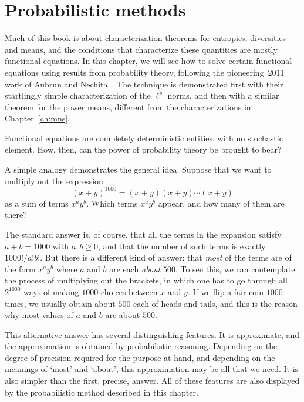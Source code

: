 \chapter{Probabilistic methods}

Much of this book is about characterization theorems for entropies,
diversities and means, and the conditions that characterize these
quantities are mostly functional%
%
% 
equations.  In this chapter, we will see how to solve certain
functional equations using results from probability theory, following the
pioneering~2011 work of Aubrun and Nechita~\cite{AuNe}.  The technique is
demonstrated first with their startlingly simple characterization of the
$\ell^p$ norms, and then with a similar theorem for the power means,
different from the characterizations in Chapter~\ref{ch:mns}.

Functional equations are completely deterministic entities, with no
stochastic element.  How, then, can the power of probability theory be
brought to bear?

A simple analogy demonstrates the general idea.  Suppose that we want to
multiply out the expression
\[
(x + y)^{1000} = (x + y)(x + y) \cdots (x + y)
\]
as a sum of terms $x^a y^b$.  Which terms $x^a y^b$%
%
% 
appear, and how many of them are there?

The standard answer is, of course, that all the terms in the expansion
satisfy $a + b = 1000$ with $a, b \geq 0$, and that the number of such
terms is exactly $1000!/a!b!$.  But there is a different kind of answer:
that \emph{most} of the terms are of the form $x^a y^b$ where $a$ and $b$
are each \emph{about} $500$.  To see this, we can contemplate
the process of multiplying out the brackets, in which one has to go through
all $2^{1000}$ ways of making $1000$ choices between $x$ and $y$.  If we
flip a fair coin%
%
% 
$1000$ times, we usually obtain about $500$ each of
heads and tails, and this is the reason why most values of $a$ and $b$ are
about $500$.

This alternative answer has several distinguishing features.  It is
approximate, and the approximation is obtained by probabilistic reasoning.
Depending on the degree of precision required for the purpose at hand, and
depending on the meanings of `most' and `about', this approximation may be
all that we need.  It is also simpler than the first, precise, answer.  All
of these features are also displayed by the probabilistic method described
in this chapter.

